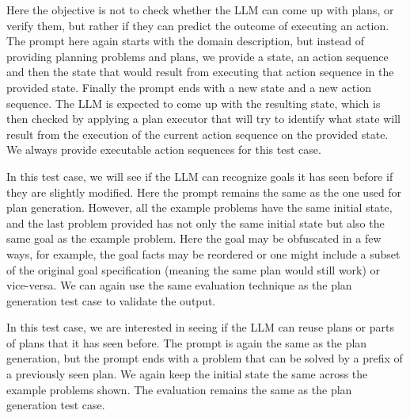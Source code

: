 
Here the objective is not to check whether the LLM can come up with plans, or verify them, but rather if they can predict the outcome of executing an action. The prompt here again starts with the domain description, but instead of providing planning problems and plans, we provide a state, an action sequence and then the state that would result from executing that action sequence in the provided state. Finally the prompt ends with a new state and a new action sequence. The LLM is expected to come up with the resulting state, which is then checked by applying a plan executor that will try to identify what state will result from the execution of the current action sequence on the provided state. We always provide executable action sequences for this test case. 

In this test case, we will see if the LLM can recognize goals it has seen before if they are slightly modified. Here the prompt remains the same as the one used for plan generation. However, all the example problems have the same initial state, and the last problem provided has not only the same initial state but also the same goal as the example problem. Here the goal may be obfuscated in a few ways, for example, the goal facts may be reordered or one might include a subset of the original goal specification (meaning the same plan would still work) or vice-versa. We can again use the same evaluation technique as the plan generation test case to validate the output.

In this test case, we are interested in seeing if the LLM can reuse plans or parts of plans that it has seen before. The prompt is again the same as the plan generation, but the prompt ends with a problem that can be solved by a prefix of a previously seen plan. We again keep the initial state the same across the example problems shown. The evaluation remains the same as the plan generation test case.

